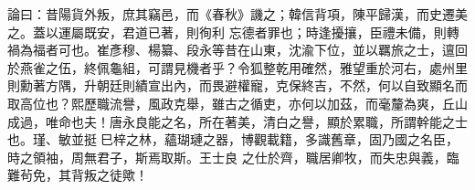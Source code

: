 \begin{pinyinscope}
 論曰：昔陽貨外叛，庶其竊邑，而《春秋》譏之；韓信背項，陳平歸漢，而史遷美之。蓋以運屬既安，君道已著，則徇利
 忘德者罪也；時逢擾攘，臣禮未備，則轉禍為福者可也。崔彥穆、楊纂、段永等昔在山東，沈渝下位，並以羈旅之士，邅回於燕雀之伍，終佩龜組，可謂見機者乎？令狐整乾用確然，雅望重於河右，處州里則勳著方隅，升朝廷則績宣出內，而畏避權寵，克保終吉，不然，何以自致顯名而取高位也？熙歷職流譽，風政克舉，雖古之循吏，亦何以加茲，而毫釐為爽，丘山成過，唯命也夫！唐永良能之名，所在著美，清白之譽，顯於累職，所謂幹能之士也。瑾、敏並挺巳梓之林，蘊瑚璉之器，博觀載籍，多識舊章，固乃國之名臣，時之領袖，周無君子，斯焉取斯。王士良
 之仕於齊，職居卿牧，而失忠與義，臨難茍免，其背叛之徒歟！



\end{pinyinscope}